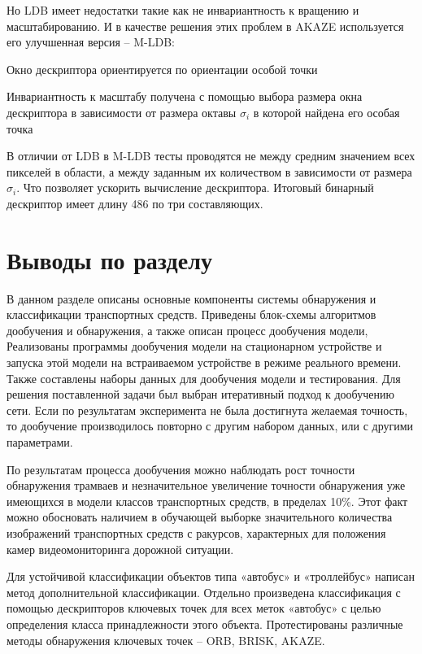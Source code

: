 Но LDB имеет недостатки такие как не инвариантность к вращению и масштабированию. И в качестве решения этих проблем в AKAZE используется его улучшенная версия – M-LDB:
%
\begin{itemize*}
  \item Окно дескриптора ориентируется по ориентации особой точки
  \item Инвариантность к масштабу получена с помощью выбора размера окна дескриптора в зависимости от размера октавы \(\sigma_i\) в которой найдена его особая точка
\end{itemize*}
%

В отличии от LDB в M-LDB тесты проводятся не между средним значением всех пикселей в области, а между заданным их количеством в зависимости от размера \(\sigma_i\). Что позволяет ускорить вычисление дескриптора. Итоговый бинарный дескриптор имеет длину 486 по три составляющих.

\section{Выводы по разделу}

В данном разделе описаны основные компоненты системы обнаружения и классификации транспортных средств. Приведены блок-схемы алгоритмов дообучения и обнаружения, а также описан процесс дообучения модели, Реализованы программы дообучения модели на стационарном устройстве и запуска этой модели на встраиваемом устройстве в режиме реального времени. Также составлены наборы данных для дообучения модели и тестирования. Для решения поставленной задачи был выбран итеративный подход к дообучению сети. Если по результатам эксперимента не была достигнута желаемая точность, то дообучение производилось повторно с другим набором данных, или с другими параметрами. 

По результатам процесса дообучения можно наблюдать рост точности обнаружения трамваев и незначительное увеличение точности обнаружения уже имеющихся в модели классов транспортных средств, в пределах 10\%. Этот факт можно обосновать наличием в обучающей выборке значительного количества изображений транспортных средств с ракурсов, характерных для положения камер видеомониторинга дорожной ситуации. 

Для устойчивой классификации объектов типа «автобус» и «троллейбус» написан метод дополнительной классификации. Отдельно произведена классификация с помощью дескрипторов ключевых точек для всех меток «автобус» с целью определения класса принадлежности этого объекта. Протестированы различные методы обнаружения ключевых точек – ORB, BRISK, AKAZE.

